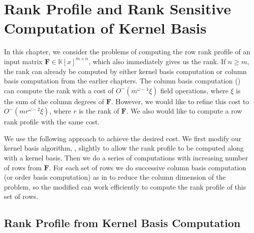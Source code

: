 
\chapter{\label{chap:rank}Rank Profile and Rank Sensitive Computation of
Kernel Basis}

In this chapter, we consider the problems of computing the row rank
profile of an input matrix $\mathbf{F}\in\mathbb{K}\left[x\right]^{m\times n}$,
which also immediately gives us the rank. If $n\ge m$, the rank can
already be computed by either kernel basis computation or column basis
computation from the earlier chapters. The column basis computation
() can compute the rank with a cost of $O^{\sim}(m^{\omega-1}\xi)$
field operations, where $\xi$ is the sum of the column degrees of
$\mathbf{F}$. However, we would like to refine this cost to $O^{\sim}\left(mr^{\omega-2}\xi\right)$,
where $r$ is the rank of $\mathbf{F}$. We also would like to compute
a row rank profile with the same cost.

We use the following approach to achieve the desired cost. We first
modify our kernel basis algorithm, ,
slightly to allow the rank profile to be computed along with a kernel
basis. Then we do a series of computations with increasing number
of rows from $\mathbf{F}$. For each set of rows we do successive
column basis computation (or order basis computation) as in 
to reduce the column dimension of the problem, so the modified 
can work efficiently to compute the rank profile of this set of rows.


\section{Rank Profile from Kernel Basis Computation}

